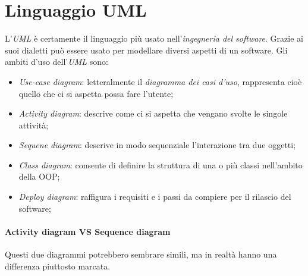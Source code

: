 \documentclass[12pt, a4paper]{report}
\theoremstyle{def}
\theoremstyle{definition}
\begin{document}
\section{Linguaggio UML}
L'\emph{UML} è certamente il linguaggio più usato nell'\emph{ingegneria del
software}. Grazie ai suoi dialetti può essere usato per modellare diversi
aspetti di un software. Gli ambiti d'uso dell'\emph{UML} sono:
\begin{itemize}
    \item \emph{Use-case diagram}: letteralmente il \emph{diagramma dei casi
    d'uso}, rappresenta cioè quello che ci si aspetta possa fare l'utente;
    \item \emph{Activity diagram}: descrive come ci si aspetta che vengano svolte
    le singole attività;
    \item \emph{Sequene diagram}: descrive in modo sequenziale l'interazione tra
    due oggetti;
    \item \emph{Class diagram}: consente di definire la struttura di una o più
    classi nell'ambito della OOP;
    \item \emph{Deploy diagram}: raffigura i requisiti e i passi da compiere per
    il rilascio del software;
\end{itemize}

\paragraph{Activity diagram VS Sequence diagram}
Questi due diagrammi potrebbero sembrare simili, ma in realtà hanno una differenza
piuttosto marcata.
\end{document}
